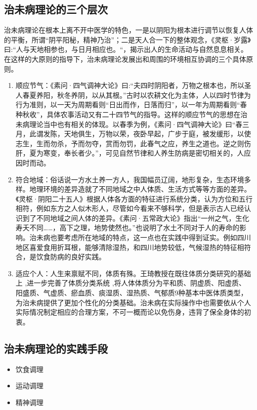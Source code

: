 \subsection{治未病理论的三个层次}
治未病理论在根本上离不开中医学的特色，一是以阴阳为根本进行调节以恢复人体的平衡，所谓“阴平阳秘，精神乃治”；二是天人合一下的整体观念，《灵枢·岁露》曰:“人与天地相参也，与日月相应也。“，揭示出人的生命活动与自然息息相关。在这样的大原则的指导下，治未病理论发展出和周围的环境相互协调的三个具体原则。
\begin{enumerate}
\item 顺应节气：《素问·四气调神大论》曰:“夫四时阴阳者，万物之根本也，所以圣人春夏养阳，秋冬养阴，以从其根。”\cite{南京中医学院医经教研组1981黄帝内经素问译释}古时以农耕文化为主体，人以四时节律为行为准则，以一天为周期看则“日出而作，日落而归”，以一年为周期看则“春种秋收”，具体农事活动又有二十四节气的指导。这样的顺应节气的思想在治未病理论当中也有相关的体现。以春季为例，《素问·四气调神大论》曰“春三月，此谓发陈，天地俱生，万物以荣，夜卧早起，广步于庭，被发缓形，以使志生，生而勿杀，予而勿夺，赏而勿罚，此春气之应，养生之道也。逆之则伤肝，夏为寒变，奉长者少。”\cite{南京中医学院医经教研组1981黄帝内经素问译释}，可见自然节律和人养生防病是密切相关的，人应因时而动。

\item 符合地域：俗话说一方水土养一方人，我国幅员辽阔，地形复杂，生态环境多样。地理环境的差异造就了不同地域之中人体质、生活方式等等方面的差异。《灵枢·阴阳二十五人》根据人体各方面的特征进行系统分类，认为方位和五行相符，例如东方之人似木形人，尽管如今看来不够科学，但是表示古人已经认识到了不同地域之间人体的差异。《素问·五常政大论》指出“一州之气，生化寿夭不同……，高下之理，地势使然也。”\cite{南京中医学院医经教研组1981黄帝内经素问译释}也说明了水土不同对于人的寿命的影响。治未病也要考虑所在地域的特点，这一点也在实践中得到证实。例如四川地区喜爱食用折耳根，能够清除湿热，和四川地势较低，气候湿热的特征相符合，是饮食防病的良好实践。

\item 适应个人：人生来禀赋不同，体质有殊。王琦教授在既往体质分类研究的基础上 ,进一步完善了体质分类系统 ,将人体体质分为平和质、阴虚质、阳虚质、
阳盛质、气虚质、瘀血质、痰湿质、湿热质、气郁质9种基本中医体质类型\cite{王琦20059}，为治未病提供了更加个性化的分类基础。治未病在实际操作中也需要依从个人实际情况制定相应的合理方案，不可一概而论以免伤身，违背了保全身体的初衷。
\end{enumerate}
\subsection{治未病理论的实践手段}
\begin{itemize}
\item 饮食调理
\item 运动调理
\item 精神调理
\end{itemize}
